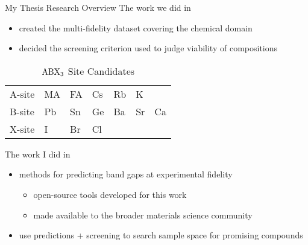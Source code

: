 \documentclass[10pt, aspectratio=169, presentation]{beamer}
\begin{document}
\begin{frame}[label={sec:orgb696d80}]{My Thesis Research Overview}
The work we did in \autocite{yang-2023-high-throug}
\begin{itemize}
\item created the multi-fidelity dataset covering the chemical domain
\item decided the screening criterion used to judge viability of compositions
\end{itemize}

\begin{table}[htbp]
\caption{\(\ce{ABX3}\) Site Candidates}
\centering
\begin{tabular}{l|llllll}
A-site & MA & FA & Cs & Rb & K & \\[0pt]
B-site & Pb & Sn & Ge & Ba & Sr & Ca\\[0pt]
X-site & I & Br & Cl &  &  & \\[0pt]
\end{tabular}
\end{table}

The work I did in \autocite{manganaris-2023-multi-fidel}
\begin{itemize}
\item methods for predicting band gaps at experimental fidelity
\begin{itemize}
\item open-source tools developed for this work
\item made available to the broader materials science community
\end{itemize}
\item use predictions + screening to search sample space for promising compounds
\end{itemize}
\end{frame}
\end{document}
